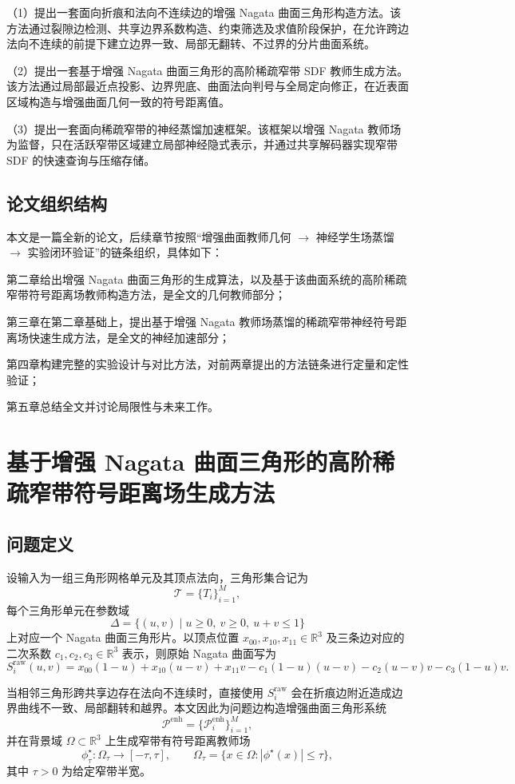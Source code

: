 \documentclass[12pt,oneside]{ctexbook}
\begin{document}
（1）提出一套面向折痕和法向不连续边的增强 Nagata 曲面三角形构造方法。该方法通过裂隙边检测、共享边界系数构造、约束筛选及求值阶段保护，在允许跨边法向不连续的前提下建立边界一致、局部无翻转、不过界的分片曲面系统。

（2）提出一套基于增强 Nagata 曲面三角形的高阶稀疏窄带 SDF 教师生成方法。该方法通过局部最近点投影、边界兜底、曲面法向判号与全局定向修正，在近表面区域构造与增强曲面几何一致的符号距离值。

（3）提出一套面向稀疏窄带的神经蒸馏加速框架。该框架以增强 Nagata 教师场为监督，只在活跃窄带区域建立局部神经隐式表示，并通过共享解码器实现窄带 SDF 的快速查询与压缩存储。

\section{论文组织结构}
本文是一篇全新的论文，后续章节按照“增强曲面教师几何 $\rightarrow$ 神经学生场蒸馏 $\rightarrow$ 实验闭环验证”的链条组织，具体如下：

第二章给出增强 Nagata 曲面三角形的生成算法，以及基于该曲面系统的高阶稀疏窄带符号距离场教师构造方法，是全文的几何教师部分；

第三章在第二章基础上，提出基于增强 Nagata 教师场蒸馏的稀疏窄带神经符号距离场快速生成方法，是全文的神经加速部分；

第四章构建完整的实验设计与对比方法，对前两章提出的方法链条进行定量和定性验证；

第五章总结全文并讨论局限性与未来工作。

\chapter{基于增强 Nagata 曲面三角形的高阶稀疏窄带符号距离场生成方法}
\section{问题定义}
设输入为一组三角形网格单元及其顶点法向，三角形集合记为
\[
\mathcal{T}=\{T_i\}_{i=1}^{M},
\]
每个三角形单元在参数域
\[
\Delta=\{(u,v)\mid u\ge 0,\ v\ge 0,\ u+v\le 1\}
\]
上对应一个 Nagata 曲面三角形片。以顶点位置 $x_{00},x_{10},x_{11}\in\mathbb R^3$ 及三条边对应的二次系数 $c_1,c_2,c_3\in\mathbb R^3$ 表示，则原始 Nagata 曲面写为
\[
S_i^{\mathrm{raw}}(u,v)=x_{00}(1-u)+x_{10}(u-v)+x_{11}v-c_1(1-u)(u-v)-c_2(u-v)v-c_3(1-u)v.
\]

当相邻三角形跨共享边存在法向不连续时，直接使用 $S_i^{\mathrm{raw}}$ 会在折痕边附近造成边界曲线不一致、局部翻转和越界。本文因此为问题边构造增强曲面三角形系统
\[
\mathcal{P}^{\mathrm{enh}}=\{\mathcal P_i^{\mathrm{enh}}\}_{i=1}^{M},
\]
并在背景域 $\Omega\subset\mathbb R^3$ 上生成窄带有符号距离教师场
\[
\phi^\star_\tau:\Omega_\tau\rightarrow[-\tau,\tau],
\qquad
\Omega_\tau=\{x\in\Omega: |\phi^\star(x)|\le \tau\},
\]
其中 $\tau>0$ 为给定窄带半宽。
\end{document}
